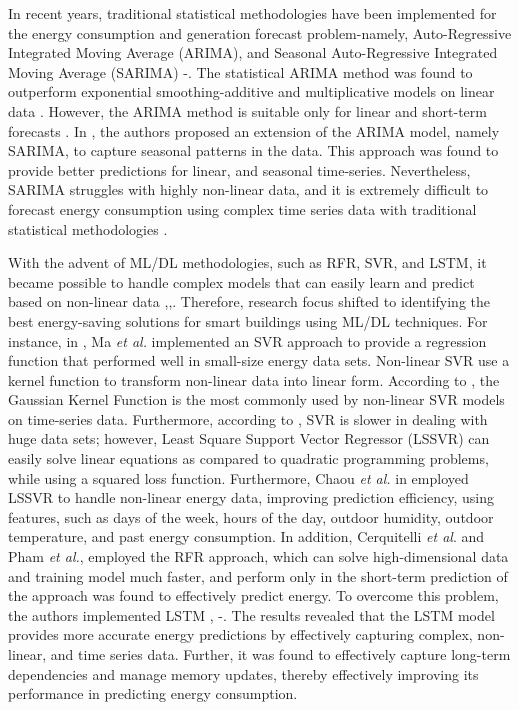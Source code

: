 \documentclass[journal]{IEEEtran}
\begin{document}
In recent years, traditional statistical methodologies have been implemented for the energy consumption and generation forecast problem-namely, Auto-Regressive Integrated Moving Average (ARIMA), and Seasonal Auto-Regressive Integrated Moving Average (SARIMA) \cite{Ref23}-\cite{Ref8}. The statistical ARIMA method was found to outperform exponential smoothing-additive and multiplicative models on linear data \cite{Ref7}. However, the ARIMA method is suitable only for linear and short-term forecasts \cite{Ref20}. In \cite{ref16}, the authors proposed an extension of the ARIMA model, namely SARIMA, to capture seasonal patterns in the data. This approach was found to provide better predictions for linear, and seasonal time-series. Nevertheless, SARIMA struggles with highly non-linear data, and it is extremely difficult to forecast energy consumption using complex time series data with traditional statistical methodologies \cite{Ref}. 



With the advent of ML/DL methodologies, such as RFR, SVR, and LSTM, it became possible to handle complex models that can easily learn and predict based on non-linear data \cite{Ref},\cite{Ref2},\cite{Ref21}. Therefore, research focus shifted to identifying the best energy-saving solutions for smart buildings using ML/DL techniques. For instance, in \cite{Ref9}, Ma \textit{et al.} implemented an SVR approach to provide a regression function that performed well in small-size energy data sets. Non-linear SVR use a kernel function to transform non-linear data into linear form\cite{Ref9}. According to \cite{Ref5}, the Gaussian Kernel Function is the most commonly used by non-linear SVR models on time-series data. Furthermore, according to \cite{Ref}, SVR is slower in dealing with huge data sets; however, Least Square Support Vector Regressor (LSSVR) can easily solve linear equations as compared to quadratic programming problems, while using a squared loss function. Furthermore, Chaou \textit{et al.} in \cite{Ref17} employed LSSVR to handle non-linear energy data, improving prediction efficiency, using features, such as days of the week, hours of the day, outdoor humidity, outdoor temperature, and past energy consumption. In addition, Cerquitelli \textit{et al}.\cite{Ref15} and Pham \textit{et al.}, \cite{Ref24} employed the RFR approach, which can solve high-dimensional data and training model much faster, and perform only in the short-term prediction of the approach was found to effectively predict energy. To overcome this problem, the authors implemented LSTM \cite{Ref20}, \cite{Ref11}-\cite{Ref14}. The results revealed that the LSTM model provides more accurate energy predictions by effectively capturing complex, non-linear, and time series data. Further, it was found to effectively capture long-term dependencies and manage memory updates, thereby effectively improving its performance in predicting energy consumption.
\end{document}
